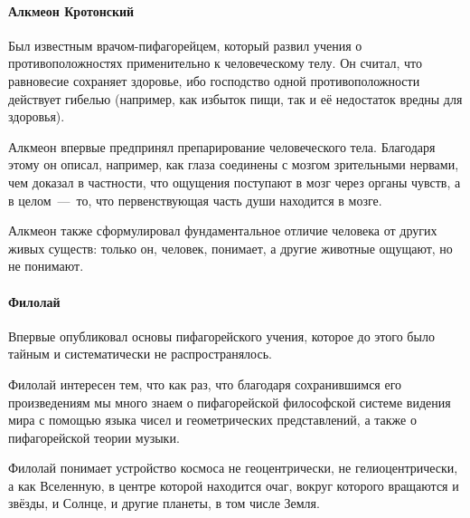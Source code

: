 \paragraph{Алкмеон Кротонский} 
Был известным врачом-пифагорейцем, который развил учения о противоположностях применительно к человеческому телу. Он считал, что равновесие сохраняет здоровье, ибо господство одной противоположности действует гибелью (например, как избыток пищи, так и её недостаток вредны для здоровья).


Алкмеон впервые предпринял препарирование человеческого тела. Благодаря
этому он описал, например, как глаза соединены с мозгом зрительными нервами, чем доказал в частности, что ощущения поступают в мозг через органы чувств, а в целом~---~то, что первенствующая часть души находится в мозге. 

Алкмеон также сформулировал фундаментальное отличие человека от других живых существ: только он, человек, понимает, а другие животные ощущают, но не понимают. 

\paragraph{Филолай}  Впервые опубликовал основы пифагорейского учения, которое до этого было тайным и систематически не распространялось. 

Филолай интересен тем, что как раз, что благодаря сохранившимся его произведениям мы много знаем о пифагорейской философской системе видения мира с помощью языка чисел и геометрических представлений, а также о пифагорейской теории музыки. 

Филолай понимает устройство космоса не геоцентрически, не гелиоцентрически, а как Вселенную, в центре которой находится очаг, вокруг которого вращаются и
звёзды, и Солнце, и другие планеты, в том числе Земля. 


